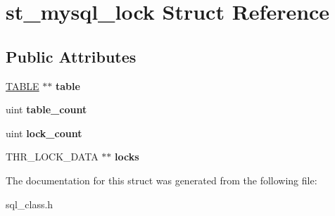 \hypertarget{structst__mysql__lock}{}\section{st\+\_\+mysql\+\_\+lock Struct Reference}
\label{structst__mysql__lock}
\subsection*{Public Attributes}
\begin{DoxyCompactItemize}
\item 
\mbox{\label{structst__mysql__lock_a6c8e423130c75aa0ab0bfc2951774c0e}} 
\mbox{\hyperlink{structTABLE}{T\+A\+B\+LE}} $\ast$$\ast$ {\bfseries table}
\item 
\mbox{\label{structst__mysql__lock_af9d5123e32a2a423bf836e14d40a996e}} 
uint {\bfseries table\+\_\+count}
\item 
\mbox{\label{structst__mysql__lock_ac234ca9c8739be011cc956709362a5cf}} 
uint {\bfseries lock\+\_\+count}
\item 
\mbox{\label{structst__mysql__lock_ad3f945f4c0b17a645833ee719d0caa6f}} 
T\+H\+R\+\_\+\+L\+O\+C\+K\+\_\+\+D\+A\+TA $\ast$$\ast$ {\bfseries locks}
\end{DoxyCompactItemize}


The documentation for this struct was generated from the following file\+:\begin{DoxyCompactItemize}
\item 
sql\+\_\+class.\+h\end{DoxyCompactItemize}
